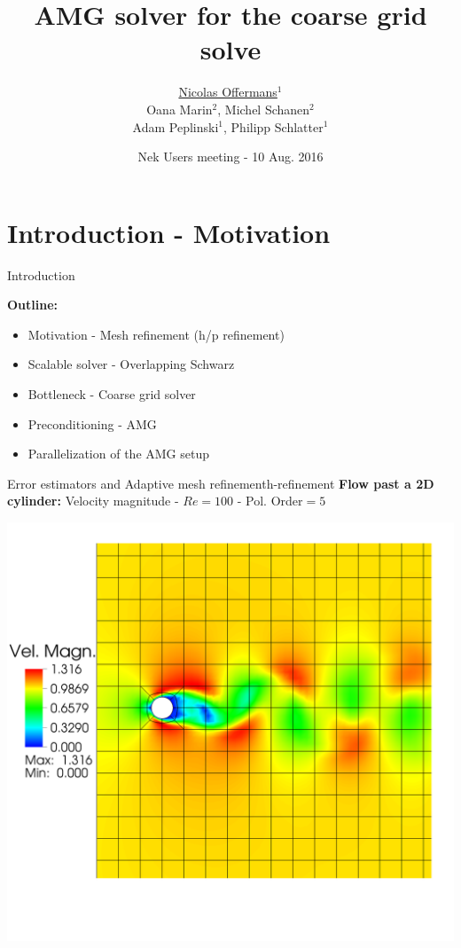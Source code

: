 \documentclass[usenames,dvipsnames,svgnames,9pt]{beamer}
\title[AMG solver for the coarse grid solve] %
{
	AMG solver for the coarse grid solve %
}
\author[Nicolas Offermans] %
{
	\underline{Nicolas Offermans}$^1$ \\
    Oana Marin$^2$, Michel Schanen$^2$ \\
	Adam Peplinski$^1$, Philipp Schlatter$^1$ 
}
\institute[unused]
{
	$^1$Linn\'e FLOW Centre, KTH Mechanics \\
	$^2$Argonne National Laboratory
}
\date[unused]
	{Nek Users meeting - 10 Aug. 2016}
\begin{document}
\titleframe %


\section{Introduction - Motivation}

\begin{frame}{Introduction}{}

\textbf{Outline:}

\begin{itemize}
\item Motivation - Mesh refinement (h/p refinement)
\item Scalable solver - Overlapping Schwarz
\item Bottleneck - Coarse grid solver
\item Preconditioning - AMG
\item Parallelization of the AMG setup
\vspace{5mm}
\end{itemize}

\end{frame}


\begin{frame}{Error estimators and Adaptive mesh refinement}{h-refinement}
\textbf{Flow past a 2D cylinder:} Velocity magnitude - $Re=100$ - Pol. Order$ = 5$

\centering
  \includegraphics[trim={0 14.5cm 0 7.2cm},clip, width=0.8\linewidth]{vel_init} 
\end{frame}
\end{document}
